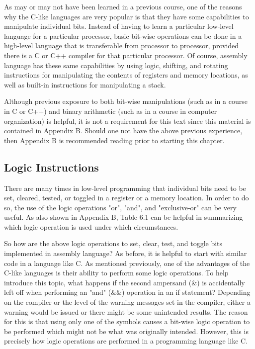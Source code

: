 \documentclass[10pt]{book}
\begin{document}
As may or may not have been learned in a previous course, one of the reasons why the C-like languages are very popular is that they have some capabilities to manipulate individual bits. Instead of having to learn a particular low-level language for a particular processor, basic bit-wise operations can be done in a high-level language that is transferable from processor to processor, provided there is a C or C++ compiler for that particular processor. Of course, assembly language has these same capabilities by using logic, shifting, and rotating instructions for manipulating the contents of registers and memory locations, as well as built-in instructions for manipulating a stack.

Although previous exposure to both bit-wise manipulations (such as in a course in C or C++) and binary arithmetic (such as in a course in computer organization) is helpful, it is not a requirement for this text since this material is contained in Appendix B. Should one not have the above previous experience, then Appendix B is recommended reading prior to starting this chapter.

\subsection{Logic Instructions}
There are many times in low-level programming that individual bits need to be set, cleared, tested, or toggled in a register or a memory location. In order to do so, the use of the logic operations "or", "and", and "exclusive-or" can be very useful. As also shown in Appendix B, Table 6.1 can be helpful in summarizing which logic operation is used under which circumstances.

So how are the above logic operations to set, clear, test, and toggle bits implemented in assembly language? As before, it is helpful to start with similar code in a language like C. As mentioned previously, one of the advantages of the C-like languages is their ability to perform some logic operations. To help introduce this topic, what happens if the second ampersand ($\&$) is accidentally left off when performing an "and" ($\&\&$) operation in an if statement? Depending on the compiler or the level of the warning messages set in the compiler, either a warning would be issued or there might be some unintended results. The reason for this is that using only one of the symbols causes a bit-wise logic operation to be performed which might not be what was originally intended. However, this is precisely how logic operations are performed in a programming language like C.
\end{document}
